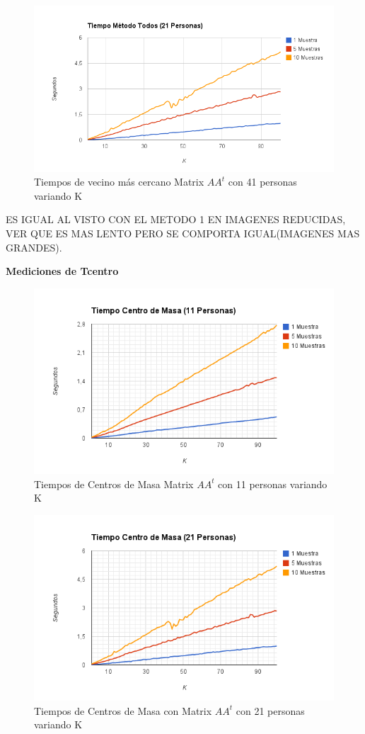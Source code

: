 \begin{figure}[H]
\includegraphics[width=1\textwidth]{img/imagef6.png}
     \caption{Tiempos de vecino más cercano Matrix $AA^t$ con 41 personas variando K}
\end{figure}

ES IGUAL AL VISTO CON EL METODO 1 EN IMAGENES REDUCIDAS, VER QUE ES MAS LENTO PERO SE COMPORTA IGUAL(IMAGENES MAS GRANDES).

\textbf{Mediciones de Tcentro }

\begin{figure}[H]
\includegraphics[width=1\textwidth]{img/imagef7.png}
     \caption{Tiempos de Centros de Masa Matrix $AA^t$ con 11 personas variando K}
\end{figure}

\begin{figure}[H]
\includegraphics[width=1\textwidth]{img/imagef8.png}
     \caption{Tiempos de Centros de Masa con Matrix $AA^t$ con 21 personas variando K}
\end{figure}


